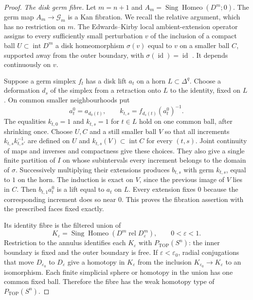 \begin{proof}
\medskip\noindent\textit{The disk germ fibre.}
Let $m=n+1$ and
$A_m=\operatorname{Sing}\operatorname{Homeo}(D^m;0)$.
The germ map $A_m\to\mathcal G_m$ is a Kan fibration.  We recall
the relative argument, which has no restriction on $m$.
The Edwards--Kirby local ambient-extension operator assigns to
every sufficiently small perturbation $v$ of the inclusion of a
compact ball $U\subset\operatorname{int}D^m$ a disk homeomorphism
$\sigma(v)$ equal to $v$ on a smaller ball $C$, supported away
from the outer boundary, with $\sigma(\operatorname{id})=
\operatorname{id}$
\cite[Theorem~5.1, p.~70; proof of Corollary~1.2, p.~79]
{EdwardsKirby1971}.  It depends continuously on $v$.

Suppose a germ simplex $f_t$ has a disk lift $a_t$ on a horn
$L\subset\Delta^q$.  Choose a deformation $d_s$ of the simplex
from a retraction onto $L$ to the identity, fixed on $L$.  On
common smaller neighbourhoods put
\[
 a^0_t=a_{d_0(t)},\qquad
 k_{t,s}=f_{d_s(t)}(a^0_t)^{-1}.
\]
The equalities $k_{t,0}=1$ and $k_{t,s}=1$ for $t\in L$ hold
on one common ball, after shrinking once.  Choose $U,C$ and a
still smaller ball $V$ so that all increments
$k_{t,s}k_{t,s'}^{-1}$ are defined on $U$ and
$k_{t,s}(V)\subset\operatorname{int}C$ for every $(t,s)$.
Joint continuity of maps and inverses and compactness give these
choices.  They also give a single finite partition of $I$ on
whose subintervals every increment belongs to the domain of
$\sigma$.  Successively multiplying their extensions produces
$b_{t,s}$ with germ $k_{t,s}$, equal to $1$ on the horn.  The
induction is exact on $V$, since the previous image of $V$ lies
in $C$.  Then $b_{t,1}a^0_t$ is a lift equal to $a_t$ on $L$.
Every extension fixes $0$ because the corresponding increment
does so near $0$.  This proves the fibration assertion with the
prescribed faces fixed exactly.

Its identity fibre is the filtered union of
\[
 K_\varepsilon=
 \operatorname{Sing}\operatorname{Homeo}
                  (D^m\;\mathrm{rel}\;D^m_\varepsilon),
 \qquad 0<\varepsilon<1.
\]
Restriction to the annulus identifies each $K_\varepsilon$ with
$P_{\mathrm{TOP}}(S^n)$: the inner boundary is fixed and the
outer boundary is free.  If $\varepsilon<\varepsilon_0$, radial
conjugations that move $D_{\varepsilon_0}$ to $D_\varepsilon$
give a homotopy in $K_\varepsilon$ from the inclusion
$K_{\varepsilon_0}\to K_\varepsilon$ to an isomorphism.
Each finite simplicial sphere or homotopy in the union has one
common fixed ball.  Therefore the fibre has the weak homotopy
type of $P_{\mathrm{TOP}}(S^n)$.


\end{proof}
